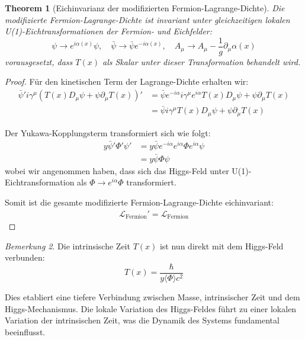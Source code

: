 \documentclass{article}
\newtheorem{theorem}{Theorem}[section]
\theoremstyle{definition}
\theoremstyle{remark}
\newtheorem{remark}[theorem]{Bemerkung}
\newcommand{\Tfield}{T(x)} %
\newcommand{\DcovT}[1]{\Tfield D_\mu #1 + #1 \partial_\mu \Tfield}
\begin{document}
		\begin{theorem}[Eichinvarianz der modifizierten Fermion-Lagrange-Dichte]
			Die modifizierte Fermion-Lagrange-Dichte ist invariant unter gleichzeitigen lokalen U(1)-Eichtransformationen der Fermion- und Eichfelder:
			\begin{equation}
				\psi \rightarrow e^{i\alpha(x)}\psi, \quad \bar{\psi} \rightarrow \bar{\psi}e^{-i\alpha(x)}, \quad A_\mu \rightarrow A_\mu - \frac{1}{g}\partial_\mu \alpha(x)
			\end{equation}
			vorausgesetzt, dass $\Tfield$ als Skalar unter dieser Transformation behandelt wird.
		\end{theorem}
		
		\begin{proof}
			Für den kinetischen Term der Lagrange-Dichte erhalten wir:
			\begin{align}
				\bar{\psi}'i\gamma^\mu(\DcovT{\psi})' &= \bar{\psi}e^{-i\alpha}i\gamma^\mu e^{i\alpha}\DcovT{\psi} \\
				&= \bar{\psi}i\gamma^\mu \DcovT{\psi}
			\end{align}
			
			Der Yukawa-Kopplungsterm transformiert sich wie folgt:
			\begin{align}
				y\bar{\psi}'\Phi'\psi' &= y\bar{\psi}e^{-i\alpha}e^{i\alpha}\Phi e^{i\alpha}\psi \\
				&= y\bar{\psi}\Phi\psi
			\end{align}
			wobei wir angenommen haben, dass sich das Higgs-Feld unter U(1)-Eichtransformation als $\Phi \rightarrow e^{i\alpha}\Phi$ transformiert.
			
			Somit ist die gesamte modifizierte Fermion-Lagrange-Dichte eichinvariant:
			\begin{align}
				\mathcal{L}_{\text{Fermion}}' = \mathcal{L}_{\text{Fermion}}
			\end{align}
		\end{proof}
		
		\begin{remark}
			Die intrinsische Zeit $\Tfield$ ist nun direkt mit dem Higgs-Feld verbunden:
			\begin{equation}
				\Tfield = \frac{\hbar}{y\langle\Phi\rangle c^2}
			\end{equation}
			
			Dies etabliert eine tiefere Verbindung zwischen Masse, intrinsischer Zeit und dem Higgs-Mechanismus. Die lokale Variation des Higgs-Feldes führt zu einer lokalen Variation der intrinsischen Zeit, was die Dynamik des Systems fundamental beeinflusst.
		\end{remark}
		
\end{document}
